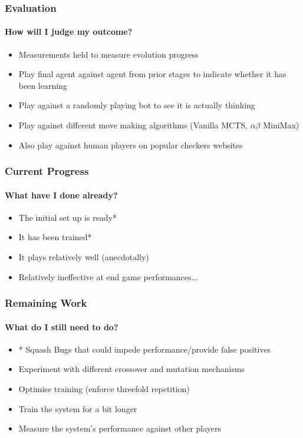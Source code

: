 \documentclass[aspectratio=169]{beamer}
\begin{document}

\begin{frame}
	\frametitle{Evaluation}
	\framesubtitle{How will I judge my outcome?}

	\begin{itemize}
		\item Measurements held to measure evolution progress
		\item Play final agent against agent from prior stages to indicate whether it has been learning
		\item Play against a randomly playing bot to see it is actually thinking
		\item Play against different move making algorithms (Vanilla MCTS, $\alpha \beta$ MiniMax)
		\item Also play against human players on popular checkers websites
	\end{itemize}
\end{frame}

\begin{frame}
	\frametitle{Current Progress}
	\framesubtitle{What have I done already?}

	\begin{itemize}
		\item The initial set up is ready*
		\item It has been trained*
		\item It plays relatively well (anecdotally)
		\item Relatively ineffective at end game performances...
	\end{itemize}
\end{frame}

\begin{frame}
	\frametitle{Remaining Work}
	\framesubtitle{What do I still need to do?}
	\begin{itemize}
		\item * Squash Bugs that could impede performance/provide false positives
		\item Experiment with different crossover and mutation mechanisms
		\item Optimise training (enforce threefold repetition)
		\item Train the system for a bit longer
		\item Measure the system's performance against other players
	\end{itemize}
\end{frame}
\end{document}
